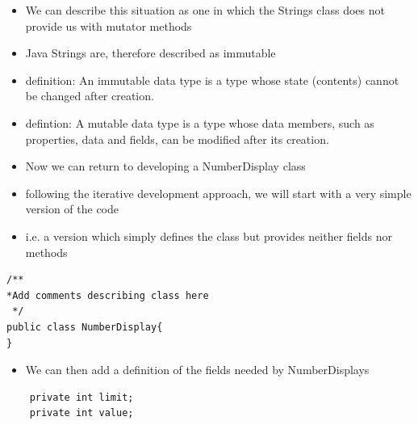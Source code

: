 \documentclass{beamer}
\begin{document}
\begin{frame}
\begin{itemize}
\item We can describe this situation as one in which the Strings class does not provide us with mutator methods
\item Java Strings are, therefore described as \alert{immutable}
\item definition: An \alert{immutable data type} is a type whose state (contents) cannot be changed after creation.
\item defintion: A \alert{mutable} data type is a type whose data members, such as properties, data and fields, can be modified after its creation.
\end{itemize}
\end{frame}

\begin{frame}[fragile]
\begin{itemize}
\item Now we can return to developing a NumberDisplay class
\item following the iterative development approach, we will start with a very simple version of the code
\item i.e. a version which simply defines the class but provides neither fields nor methods
\end{itemize}
\tiny
\begin{block}{}
\begin{lstlisting}
/**
*Add comments describing class here
 */
public class NumberDisplay{
}
\end{lstlisting}
\end{block}

\end{frame}

\begin{frame}[fragile]

\begin{itemize}
\item We can then add a definition of the fields needed by NumberDisplays
\end{itemize}

\begin{block}{}
\begin{lstlisting}
    private int limit;
    private int value;
\end{lstlisting}
\end{block}
\end{frame}
\end{document}
